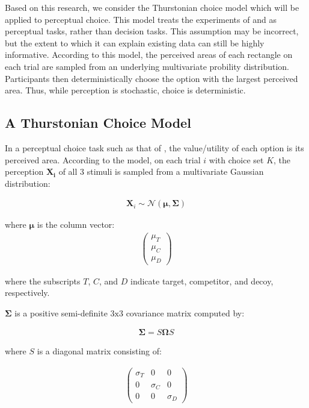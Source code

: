 Based on this research, we consider the Thurstonian choice model which will be applied to perceptual choice. This model treats the experiments of \textcite{trueblood2013not} and \textcite{spektorWhenGoodLooks2018b} as perceptual tasks, rather than decision tasks. This assumption may be incorrect, but the extent to which it can explain existing data can still be highly informative. According to this model, the perceived areas of each rectangle on each trial are sampled from an underlying multivariate probility distribution. Participants then deterministically choose the option with the largest perceived area. Thus, while perception is stochastic, choice is deterministic.

\subsection{A Thurstonian Choice Model}

In a perceptual choice task such as that of \textcite{spektorWhenGoodLooks2018b}, the value/utility of each option is its perceived area. According to the model, on each trial $i$ with choice set $K$, the perception $\mathbf{X_i}$ of all $3$ stimuli is sampled from a multivariate Gaussian distribution:

\begin{align}
   \mathbf{X}_{i} \sim \mathcal{N}(\boldsymbol{\mu}, \boldsymbol{\Sigma})
   \label{eqn:mvnorm}
\end{align}

where $\boldsymbol{\mu}$ is the column vector:
\begin{align}
   \begin{pmatrix}
      \mu_{T} \\
      \mu_{C} \\
      \mu_{D}
      \end{pmatrix}
   \label{eqn:mu}
\end{align}

where the subscripts $T$, $C$, and $D$ indicate target, competitor, and decoy, respectively.

$\boldsymbol{\Sigma}$ is a positive semi-definite $3 \text{x} 3$ covariance matrix computed by:

\begin{align}
   \boldsymbol{\Sigma}=S\boldsymbol{\Omega}S
   \label{eqn:Sigma}
\end{align}

where $S$ is a diagonal matrix consisting of: 

\begin{align}
   \begin{pmatrix}
      \sigma_{T} & 0 & 0 \\
      0 & \sigma_{C} & 0 \\
      0 & 0 & \sigma_{D} 
   \end{pmatrix}
\label{eqn:S}
\end{align}

